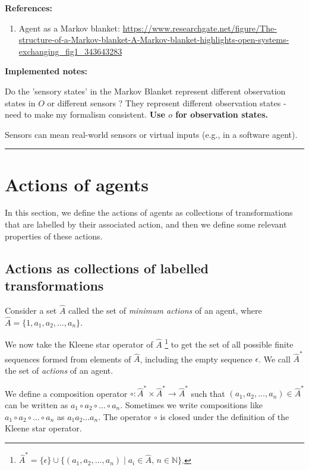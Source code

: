 {\begin{compactitem}
    \item \textbf{References:}
    \begin{enumerate}
        \item Agent as a Markov blanket: \url{https://www.researchgate.net/figure/The-structure-of-a-Markov-blanket-A-Markov-blanket-highlights-open-systems-exchanging_fig1_343643283}
    \end{enumerate}
\end{compactitem}


\textbf{Implemented notes:}
\begin{compactitem}
    \item Do the 'sensory states' in the Markov Blanket represent different observation states in $O$ or different sensors ? They represent different observation states - need to make my formalism consistent. \textbf{Use $o$ for observation states.}
    \item Sensors can mean real-world sensors or virtual inputs (e.g., in a software agent).
\end{compactitem}
\noindent\rule{\textwidth}{1mm}
}

\section{Actions of agents}

In this section, we define the actions of agents as collections of transformations that are labelled by their associated action, and then we define some relevant properties of these actions.

\subsection{Actions as collections of labelled transformations}

Consider a set $\hat{A}$ called the set of \emph{minimum actions} of an agent, where $\hat{A} = \{1, a_{1}, a_{2}, \dots, a_{n}\}$.

We now take the Kleene star operator of $\hat{A}$ \footnote{
$\hat{A}^{*} = \{ \epsilon \} \cup \{ (a_1, a_2, \dots, a_n) \mid a_i \in \hat{A}, \, n \in \mathbb{N} \}$.
} to get the set of all possible finite sequences formed from elements of $\hat{A}$, including the empty sequence $\epsilon$.
We call $\hat{A}^{*}$ the set of \emph{actions} of an agent.

We define a composition operator $\circ: \hat{A}^{*} \times \hat{A}^{*} \to \hat{A}^{*}$ such that $(a_1, a_2, \dots, a_n) \in \hat{A}^{*}$ can be written as $a_1 \circ a_2 \circ \dots \circ a_n$.
Sometimes we write compositions like $a_1 \circ a_2 \circ \dots \circ a_n$ as $a_1 a_2 \dots a_n$.
The operator $\circ$ is closed under the definition of the Kleene star operator.

